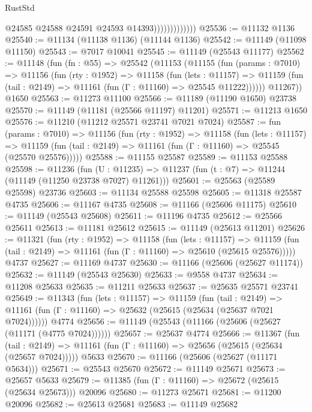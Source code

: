 \begin{lexlean}{RustStd}
\begin{coremodule}
                              @24585
                              @24588
                              @24591
                              @24593
                              @14393)))))))))))))
@25536 := @11132 @1136
@25540 := @11134 (@11138 @1136) (@11144 @1136)
@25542 := @11149 (@11098 @11150)
@25543 := @7017 @10041
@25545 := @11149 (@25543 @11177)
@25562 := @11148
    (fun (fn : @55) =>
    @25542
      (@11153
        (@11155
          (fun (params : @7010) =>
          @11156
            (fun (rty : @1952) =>
            @11158
              (fun (lets : @11157) =>
              @11159 (fun (tail : @2149) => @11161 (fun (Γ : @11160) => @25545 @11222))))))
        @11267))
    @1650
@25563 := @11273 @11100
@25566 := @11189 (@11190 @1650) @23738
@25570 := @11149 (@11181 (@25566 @11197) @11201)
@25571 := @11213 @1650
@25576 := @11210 (@11212 @25571 @23741 @7021 @7024)
@25587 := fun (params : @7010) =>
  @11156
    (fun (rty : @1952) =>
    @11158
      (fun (lets : @11157) =>
      @11159 (fun (tail : @2149) => @11161 (fun (Γ : @11160) => @25545 (@25570 @25576)))))
@25588 := @11155 @25587
@25589 := @11153 @25588
@25598 := @11236
    (fun (U : @11235) => @11237 (fun (t : @7) => @11244 (@11149 (@11250 @23738 @7027) @11261)))
@25601 := @25563 (@25589 @25598) @23736
@25603 := @11134 @25588 @25598
@25605 := @11318 @25587 @4735
@25606 := @11167 @4735
@25608 := @11166 (@25606 @11175)
@25610 := @11149 (@25543 @25608)
@25611 := @11196 @4735
@25612 := @25566 @25611
@25613 := @11181 @25612
@25615 := @11149 (@25613 @11201)
@25626 := @11321
    (fun (rty : @1952) =>
    @11158
      (fun (lets : @11157) =>
      @11159 (fun (tail : @2149) => @11161 (fun (Γ : @11160) => @25610 (@25615 @25576)))))
    @4737
@25627 := @11169 @4737
@25630 := @11166 (@25606 (@25627 @11174))
@25632 := @11149 (@25543 @25630)
@25633 := @9558 @4737
@25634 := @11208 @25633
@25635 := @11211 @25633
@25637 := @25635 @25571 @23741
@25649 := @11343
    (fun (lets : @11157) =>
    @11159
      (fun (tail : @2149) =>
      @11161 (fun (Γ : @11160) => @25632 (@25615 (@25634 (@25637 @7021 @7024))))))
    @4774
@25656 := @11149 (@25543 (@11166 (@25606 (@25627 (@11171 (@4775 @7024))))))
@25657 := @25637 @4774
@25666 := @11367
    (fun (tail : @2149) => @11161 (fun (Γ : @11160) => @25656 (@25615 (@25634 (@25657 @7024)))))
    @5633
@25670 := @11166 (@25606 (@25627 (@11171 @5634)))
@25671 := @25543 @25670
@25672 := @11149 @25671
@25673 := @25657 @5633
@25679 := @11385 (fun (Γ : @11160) => @25672 (@25615 (@25634 @25673))) @20096
@25680 := @11273 @25671
@25681 := @11200 @20096
@25682 := @25613 @25681
@25683 := @11149 @25682

\end{coremodule}
\end{lexlean}
